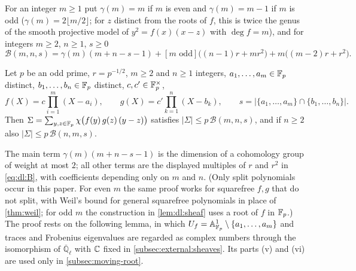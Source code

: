 For an integer $m\ge1$ put $\gamma(m)=m$ if $m$ is even and $\gamma(m)=m-1$ if
$m$ is odd ($\gamma(m)=2\lfloor m/2\rfloor$; for $z$ distinct from the roots of $f$, this is twice the genus of the smooth projective model of $y^2=f(x)(x-z)$ with $\deg f=m$), and for integers $m\ge2$, $n\ge1$, $s\ge0$
\begin{equation}\label{eq:dl:B}
  \mathcal B(m,n,s)=\gamma(m)(m+n-s-1)+[m\text{ odd}]\big((n-1)r+mr^2\big)
  +m\big((m-2)r+r^2\big).
\end{equation}

\begin{theorem}\label{thm:dl:H2}
Let $p$ be an odd prime, $r=p^{-1/2}$, $m\ge2$ and $n\ge1$ integers,
$a_1,\dots,a_m\in\mathbb F_p$ distinct, $b_1,\dots,b_n\in\mathbb F_p$ distinct,
$c,c'\in\mathbb F_p^\times$,
\[
  f(X)=c\prod_{i=1}^m(X-a_i),\qquad g(X)=c'\prod_{k=1}^n(X-b_k),\qquad
  s=\big|\{a_1,\dots,a_m\}\cap\{b_1,\dots,b_n\}\big| .
\]
Then $\Sigma=\sum_{y,z\in\mathbb F_p}\chi\big(f(y)\,g(z)\,(y-z)\big)$ satisfies
$|\Sigma|\le p\,\mathcal B(m,n,s)$, and if $n\ge2$ also
$|\Sigma|\le p\,\mathcal B(n,m,s)$.
\end{theorem}

\noindent The main term $\gamma(m)(m+n-s-1)$ is the dimension of a cohomology
group of weight at most $2$; all other terms are the displayed
multiples of $r$ and $r^2$ in \eqref{eq:dl:B}, with coefficients
depending only on $m$ and $n$. (Only split
polynomials occur in this paper. For even $m$ the same proof works for
squarefree $f,g$ that do not split, with Weil's bound for general squarefree
polynomials in place of \cref{thm:weil}; for odd $m$ the construction in
\cref{lem:dl:sheaf} uses a root of $f$ in $\mathbb F_p$.) The proof rests on the
following lemma, in which $U_f=\mathbb A^1_{\mathbb F_p}\setminus\{a_1,\dots,a_m\}$ and
traces and Frobenius eigenvalues are regarded as complex numbers through the
isomorphism of $\overline{\mathbb Q}_\ell$ with $\mathbb C$ fixed in
\cref{subsec:external:sheaves}. Its parts (v) and (vi) are used only in
\cref{subsec:moving-root}.

